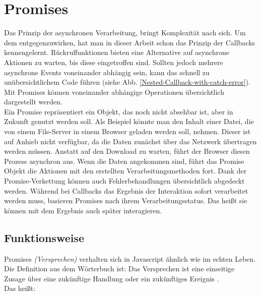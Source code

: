 \section{Promises}

Das Prinzip der asynchronen Verarbeitung, bringt Komplexität nach sich. Um dem entgegenzuwirken, hat man in dieser Arbeit schon das Prinzip der Callbacks kennengelernt. Rückruffunktionen bieten eine Alternative auf asynchrone Aktionen zu warten, bis diese eingetroffen sind. Sollten jedoch mehrere asynchrone Events voneinander abhängig sein, kann das schnell zu unübersichtlichem Code führen (siehe Abb. \ref{Nested-Callback-with-catch-error}). Mit Promises können voneinander abhängige Operationen übersichtlich dargestellt werden.\\

\noindent
Ein Promise repräsentiert ein Objekt, das noch nicht absehbar ist, aber in Zukunft genutzt werden soll. Als Beispiel könnte man den Inhalt einer Datei, die von einem File-Server in einem Browser geladen werden soll, nehmen. Dieser ist auf Anhieb nicht verfügbar, da die Daten zunächst über das Netzwerk übertragen werden müssen. Anstatt auf den Download zu warten, führt der Browser diesen Prozess asynchron aus. Wenn die Daten angekommen sind, führt das Promise Objekt die Aktionen mit den erstellten Verarbeitungsmethoden fort. Dank der Promise-Verkettung können auch Fehlerbehandlungen übersichtlich abgedeckt werden. Während bei Callbacks das Ergebnis der Interaktion sofort verarbeitet werden muss, basieren Promises nach ihrem Verarbeitungsstatus. Das heißt sie können mit dem Ergebnis auch \glqq{}später\grqq{} interagieren.

\subsection{Funktionsweise}

\noindent
Promises \textit{(Versprechen)} verhalten sich in Javascript ähnlich wie im echten Leben. Die Definition aus dem Wörterbuch ist: Das Versprechen ist eine einseitige Zusage über eine zukünftige Handlung oder ein zukünftiges Ereignis \cite{versprechen}.\\

\noindent
Das heißt:


